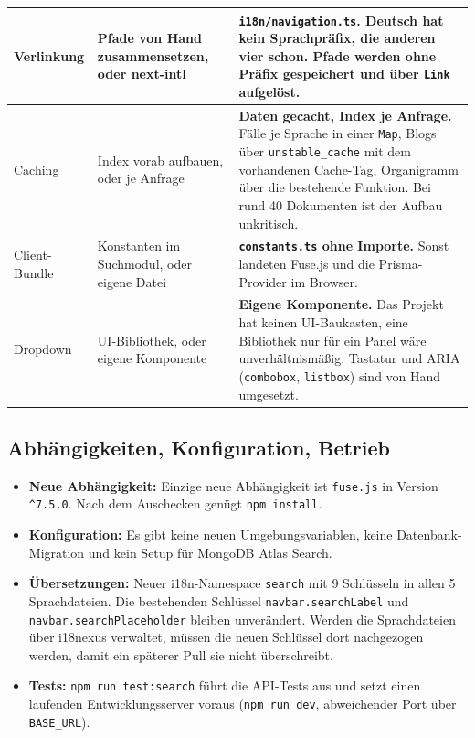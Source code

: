 \documentclass[11pt,a4paper]{article}
\let\oldsubsection\subsection
\renewcommand{\subsection}{\needspace{6\baselineskip}\oldsubsection}
\begin{document}
\begin{longtable}{@{}>{\raggedright\arraybackslash}p{3cm} >{\raggedright\arraybackslash}p{4.2cm} >{\raggedright\arraybackslash}p{7.6cm}@{}}
\midrule
Verlinkung & Pfade von Hand zusammensetzen, oder next-intl & \textbf{\texttt{i18n/navigation.ts}.} Deutsch hat kein Sprachpräfix, die anderen vier schon. Pfade werden ohne Präfix gespeichert und über \texttt{Link} aufgelöst. \\
\midrule
Caching & Index vorab aufbauen, oder je Anfrage & \textbf{Daten gecacht, Index je Anfrage.} Fälle je Sprache in einer \texttt{Map}, Blogs über \texttt{unstable\_cache} mit dem vorhandenen Cache-Tag, Organigramm über die bestehende Funktion. Bei rund 40 Dokumenten ist der Aufbau unkritisch. \\
\midrule
Client-Bundle & Konstanten im Suchmodul, oder eigene Datei & \textbf{\texttt{constants.ts} ohne Importe.} Sonst landeten Fuse.js und die Prisma-Provider im Browser. \\
\midrule
Dropdown & UI-Bibliothek, oder eigene Komponente & \textbf{Eigene Komponente.} Das Projekt hat keinen UI-Baukasten, eine Bibliothek nur für ein Panel wäre unverhältnismäßig. Tastatur und ARIA (\texttt{combobox}, \texttt{listbox}) sind von Hand umgesetzt. \\
\bottomrule
\end{longtable}
\normalsize

\subsection{Abhängigkeiten, Konfiguration, Betrieb}
\begin{itemize}
  \item \textbf{Neue Abhängigkeit:} Einzige neue Abhängigkeit ist \texttt{fuse.js} in Version \texttt{\^{}7.5.0}. Nach dem Auschecken genügt \texttt{npm install}.
  \item \textbf{Konfiguration:} Es gibt keine neuen Umgebungsvariablen, keine Datenbank-Migration und kein Setup für MongoDB Atlas Search.
  \item \textbf{Übersetzungen:} Neuer i18n-Namespace \texttt{search} mit 9 Schlüsseln in allen 5 Sprachdateien. Die bestehenden Schlüssel \texttt{navbar.searchLabel} und \texttt{navbar.searchPlaceholder} bleiben unverändert. Werden die Sprachdateien über i18nexus verwaltet, müssen die neuen Schlüssel dort nachgezogen werden, damit ein späterer Pull sie nicht überschreibt.
  \item \textbf{Tests:} \texttt{npm run test:search} führt die API-Tests aus und setzt einen laufenden Entwicklungsserver voraus (\texttt{npm run dev}, abweichender Port über \texttt{BASE\_URL}).
\end{itemize}
\end{document}
